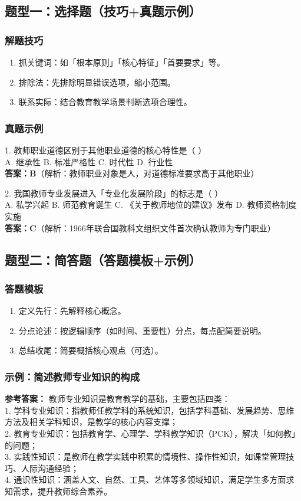 \documentclass[12pt,a4paper]{article}
\begin{document}
\subsection{题型一：选择题（技巧+真题示例）}
\subsubsection{解题技巧}
\begin{enumerate}[label=•,itemsep=0.3ex]
\item 抓关键词：如「根本原则」「核心特征」「首要要求」等。
\item 排除法：先排除明显错误选项，缩小范围。
\item 联系实际：结合教育教学场景判断选项合理性。
\end{enumerate}

\subsubsection{真题示例}
1. 教师职业道德区别于其他职业道德的核心特性是（ ）\\
A. 继承性 B. 标准严格性 C. 时代性 D. 行业性\\
\textbf{答案：B}（解析：教师职业对象是人，对道德标准要求高于其他职业）

2. 我国教师专业发展进入「专业化发展阶段」的标志是（ ）\\
A. 私学兴起 B. 师范教育诞生 C. 《关于教师地位的建议》发布 D. 教师资格制度实施\\
\textbf{答案：C}（解析：1966年联合国教科文组织文件首次确认教师为专门职业）

\subsection{题型二：简答题（答题模板+示例）}
\subsubsection{答题模板}
\begin{enumerate}[label=•,itemsep=0.3ex]
\item 定义先行：先解释核心概念。
\item 分点论述：按逻辑顺序（如时间、重要性）分点，每点配简要说明。
\item 总结收尾：简要概括核心观点（可选）。
\end{enumerate}

\subsubsection{示例：简述教师专业知识的构成}
\textbf{参考答案：}
教师专业知识是教育教学的基础，主要包括四类：\\
1. 学科专业知识：指教师任教学科的系统知识，包括学科基础、发展趋势、思维方法及相关学科知识，是教学的核心内容支撑；\\
2. 教育专业知识：包括教育学、心理学、学科教学知识（PCK），解决「如何教」的问题；\\
3. 实践性知识：是教师在教学实践中积累的情境性、操作性知识，如课堂管理技巧、人际沟通经验；\\
4. 通识性知识：涵盖人文、自然、工具、艺体等多领域知识，满足学生多方面求知需求，提升教师综合素养。
\end{document}
